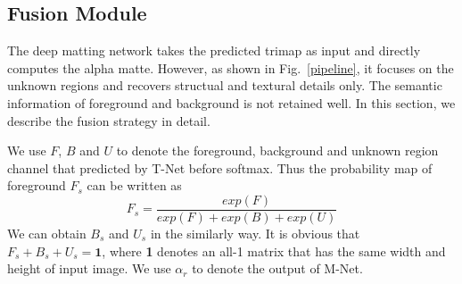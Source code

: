 \begin{comment}
\textbf{Implementation details:} Although our human matting dataset has more than 34k human instances, most of them are models from an e-commerce website and have much less complex structural details as shown in the last three columns in Fig. \ref{dataset_intro}. It is vulnerable to overfitting if we train our M-Net on this dataset directly. Therefore, before end to end training detailed in the next section, we train a much general matting model on the general matting dataset provided by Xu et al. \cite{xu2017deep}. Specifically, we filter out the 20 human alpha mattes with their foregrounds from this general matting dataset and obtain 411 alpha mattes with their foregrounds as our training dataset in this stage. We then composite this 411 foregrounds onto 41100 backgrounds (100 backgrounds per foreground) with corresponding ground truth alpha mattes. It is noting that this 41100 images contains kinds of objects as foregrounds including human and the foregrounds and backgrounds used in our human matting test dataset described before do not appear in this training dataset. We augment this general dataset similar to \cite{xu2017deep}. We find it is crucial for the performance of M-Net to augment the kernel sizes of erosion and dilation that operated on the alpha mattes to generated trimaps online.

As the encoder part of our M-Net is the same as the convolutional parts of the batch normalization version of VGG16 except for the first layer, we initialize these layers with the weights trained on ImageNet. For the first layer, we initialize the extra 3 channels with zeros. For the decoder parts, we initialize them with Xavier. We select Adam as our optimizer. We first set the learning rate to be $10^{-4}$, when the validation loss no longer descend, we set it to $10^{-5}$ until the model converged.
\end{comment}

\subsection{Fusion Module}
The deep matting network takes the predicted trimap as input and directly computes the alpha matte.
However, as shown in Fig.~\ref{pipeline}, it focuses on the unknown regions and recovers structual and textural details only.
The semantic information of foreground and background is not retained well.
In this section, we describe the fusion strategy in detail.

We use $F$, $B$ and $U$ to denote the foreground, background and unknown region channel that predicted by T-Net before softmax. Thus the probability map of foreground $F_s$ can be written as
\begin{equation}
\label{equa_foreground_score}
F_{s} = \frac{exp(F)}{exp(F) +exp(B) + exp(U)}
\end{equation}
We can obtain $B_s$ and $U_s$ in the similarly way.
It is obvious that $F_s + B_s + U_s = \textbf{1}$, where \textbf{1} denotes an all-1 matrix that has the same width and height of input image.
We use $\alpha_{r}$ to denote the output of M-Net.

